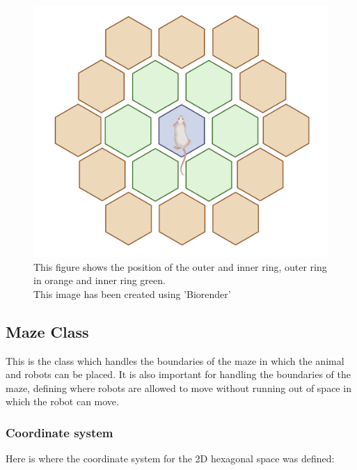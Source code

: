 \begin{figure}
    \centering
    \includegraphics[scale = 0.5 ]{images/outer_rings.png}
    \caption{This figure shows the position of the outer and inner ring, outer ring in orange and inner ring green.\\ This image has been created using 'Biorender' \cite{biorender}}
    \label{fig:my_label}
\end{figure}




\subsection{Maze Class}

This is the class which handles the boundaries of the maze in which the animal and robots can be placed.
It is also important for handling the boundaries of the maze, defining where robots are allowed to move without running out of space in which the robot can move.

\subsubsection{Coordinate system}
Here is where the coordinate system for the 2D hexagonal space was defined:

